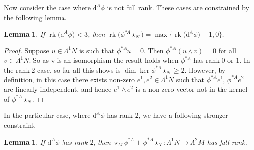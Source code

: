\documentclass[pdftex]{sigma}
\newcommand{\1}{{\mathbb{1}}}
\def \d{\mathrm{d}}
\newcommand{\rk}{{\operatorname{rk}}}
\numberwithin{equation}{section}
\newtheorem{Lemma}[Theorem]{Lemma}
\begin{document}
Now consider the case where $\d^A\phi$ is not full rank. These cases are constrained by the following lemma.
\begin{Lemma}\label{lem:nullity}
 If $\rk\big(\d^A\phi\big)<3$, then $\rk\big(\phi^{\ast A}\star_N\big)=\max\bigl\{\rk\big(\d^A\phi\big)-1,0\bigr\}$.
\end{Lemma}
\begin{proof}
 Suppose $u\in\Lambda^1N$ is such that $\phi^{\ast A}u=0$. Then $\phi^{\ast A}(u\wedge v)=0$ for all $v\in\Lambda^1N$. So as $\star$ is an isomorphism the result holds when $\phi^{\ast A}$ has rank $0$ or $1$. In the rank $2$ case, so far all this shows is $\dim\ker\phi^{\ast A}\star_{N}\geq2$. However, by definition, in this case there exists non-zero $e^1, e^2\in\Lambda^1N$ such that $\phi^{\ast A}e^1$, $\phi^{\ast A}e^2$ are linearly independent, and hence $e^1\wedge e^2$ is a non-zero vector not in the kernel of $\phi^{\ast A}\star_{N}$.
\end{proof}
In the particular case, where $\d^A\phi$ has rank $2$, we have a following stronger constraint.
\begin{Lemma}\label{lem:rank-2-reduction}
 If $\d^A\phi$ has rank $2$, then $\star_{M}\phi^{\ast A}+\phi^{\ast A}\star_{N}\colon \Lambda^1N\to\Lambda^2M$ has full rank.
\end{Lemma}
\end{document}
